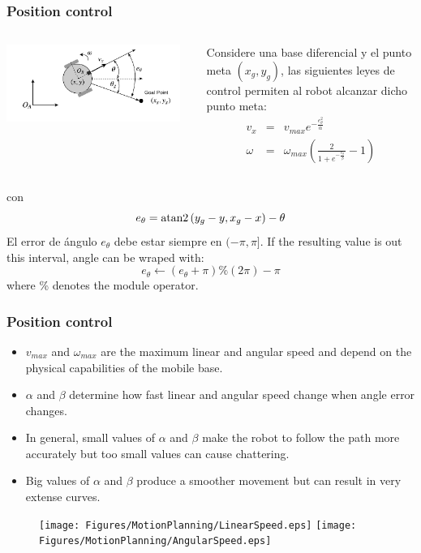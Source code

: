 \begin{frame}\frametitle{Position control}
  \begin{columns}
    \begin{column}{0.5\textwidth}
      \includegraphics[width=0.95\textwidth]{Figures/MotionPlanning/GoalPose.pdf}
    \end{column}
    \begin{column}{0.5\textwidth}
      Considere una base diferencial y el punto meta $(x_g, y_g)$, las siguientes leyes de control permiten al robot alcanzar dicho punto meta:
      \begin{eqnarray*}
        v_x    &=& v_{max}e^{-\frac{e_{\theta}^{2}}{\alpha}}\label{eq:Control11}\\
        \omega &=& \omega_{max}\left(\frac{2}{1+e^{-\frac{e_{\theta}}{\beta}}}-1\right)\label{eq:Control12}
      \end{eqnarray*}
    \end{column}
  \end{columns}
  con
  \[e_{\theta} = \operatorname{atan2}\left(y_g - y, x_g - x\right) - \theta\]
  El error de ángulo $e_\theta$ debe estar siempre en $(-\pi, \pi]$. If the resulting value is out this interval, angle can be wraped with:
  \[e_\theta \leftarrow \left(e_\theta + \pi\right)\% (2\pi) - \pi\]
  where \% denotes the module operator. 
\end{frame}

\begin{frame}\frametitle{Position control}
  \begin{itemize}
  \item $v_{max}$ and $\omega_{max}$ are the maximum linear and angular speed and depend on the physical capabilities of the mobile base.
  \item $\alpha$ and $\beta$ determine how fast linear and angular speed change when angle error changes.
  \item In general, small values of $\alpha$ and $\beta$ make the robot to follow the path more accurately but too small values can cause chattering.
    \item Big values of  $\alpha$ and $\beta$ produce a smoother movement but can result in very extense curves. 
  \end{itemize}
  \begin{figure}
    \centering
    \texttt{[image: Figures/MotionPlanning/LinearSpeed.eps]}
    \texttt{[image: Figures/MotionPlanning/AngularSpeed.eps]}
  \end{figure}
\end{frame}



